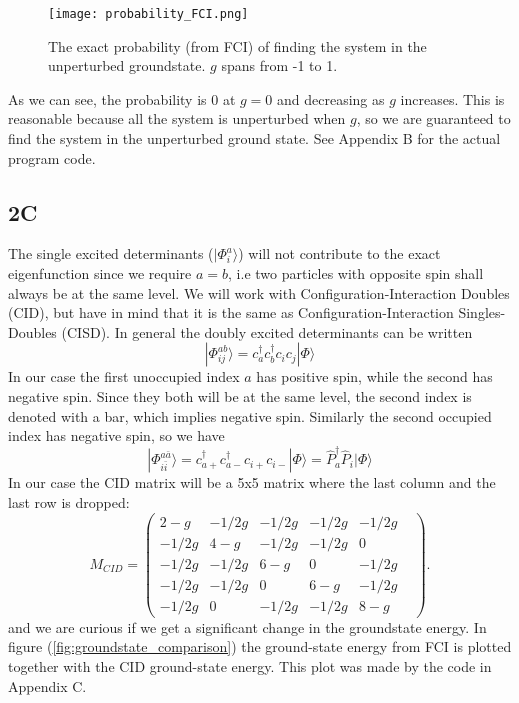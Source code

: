 \documentclass[norsk,a4paper,12pt]{article}
\begin{document}
\begin{figure}[H]
\centering
\texttt{[image: probability\_FCI.png]}
\caption{The exact probability (from FCI) of finding the system in the unperturbed groundstate. $g$ spans from -1 to 1. \label{fig:prob_FCI}}
\end{figure}

As we can see, the probability is 0 at $g=0$ and decreasing as $g$ increases. This is reasonable because all the system is unperturbed when $g$, so we are guaranteed to find the system in the unperturbed ground state. See Appendix B for the actual program code. 

\subsection*{2C}
The single excited determinants ($|\Phi_i^a\rangle$) will not contribute to the exact eigenfunction since we require $a=b$, i.e two particles with opposite spin shall always be at the same level. We will work with Configuration-Interaction Doubles (CID), but have in mind that it is the same as Configuration-Interaction Singles-Doubles (CISD). In general the doubly excited determinants can be written
\begin{equation}
|\Phi_{ij}^{ab}\rangle=c_a^{\dagger}c_b^{\dagger}c_ic_j|\Phi\rangle
\end{equation}
In our case the first unoccupied index $a$ has positive spin, while the second has negative spin. Since they both will be at the same level, the second index is denoted with a bar, which implies negative spin. Similarly the second occupied index has negative spin, so we have
\begin{equation}
|\Phi_{i\bar{i}}^{a\bar{a}}\rangle=c_{a+}^{\dagger}c_{a-}^{\dagger}c_{i+}c_{i-}|\Phi\rangle=\hat{P}_a^{\dagger}\hat{P}_i|\Phi\rangle
\end{equation}
In our case the CID matrix will be a 5x5 matrix where the last column and the last row is dropped:
\begin{equation}
M_{CID}=\begin{pmatrix} 
2-g&-1/2g&-1/2g&-1/2g&-1/2g\\
-1/2g&4-g&-1/2g&-1/2g&0&\\
-1/2g&-1/2g&6-g&0&-1/2g\\
-1/2g&-1/2g&0&6-g&-1/2g\\
-1/2g&0&-1/2g&-1/2g&8-g\end{pmatrix}.
\end{equation}
and we are curious if we get a significant change in the groundstate energy. In figure (\ref{fig:groundstate_comparison}) the ground-state energy from FCI is plotted together with the CID ground-state energy. This plot was made by the code in Appendix C.
\end{document}
